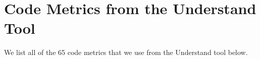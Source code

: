 \section{Code Metrics from the Understand Tool} \label{appendix:code_metrics}
\begin{comment}
\end{comment}

We list all of the 65 code metrics that we use from the Understand tool below.



